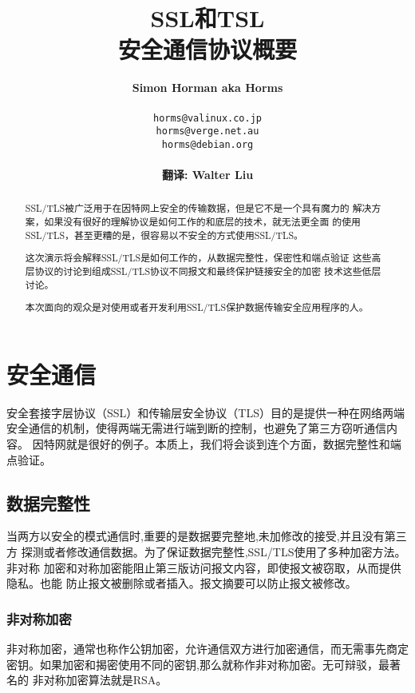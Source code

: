 \documentclass[11pt]{article}
\title{SSL和TSL\\
安全通信协议概要}
\author{\textbf{Simon Horman aka Horms} \\
        \\
\texttt{horms@valinux.co.jp}\\
\texttt{horms@verge.net.au}\\
\texttt{horms@debian.org}\\
\\
\textbf{翻译: Walter Liu}\\
}
\date{}
\begin{document}
\maketitle
\pagebreak

\begin{abstract}

          SSL/TLS被广泛用于在因特网上安全的传输数据，但是它不是一个具有魔力的
        解决方案，如果没有很好的理解协议是如何工作的和底层的技术，就无法更全面
        的使用SSL/TLS，甚至更糟的是，很容易以不安全的方式使用SSL/TLS。

        这次演示将会解释SSL/TLS是如何工作的，从数据完整性，保密性和端点验证
        这些高层协议的讨论到组成SSL/TLS协议不同报文和最终保护链接安全的加密
        技术这些低层讨论。

        本次面向的观众是对使用或者开发利用SSL/TLS保护数据传输安全应用程序的人。


\end{abstract}

\tableofcontents

\section{安全通信}

安全套接字层协议（SSL）和传输层安全协议（TLS）目的是提供一种在网络两端
安全通信的机制，使得两端无需进行端到断的控制，也避免了第三方窃听通信内容。
因特网就是很好的例子。本质上，我们将会谈到连个方面，数据完整性和端点验证。
\\

\subsection{数据完整性}
当两方以安全的模式通信时,重要的是数据要完整地,未加修改的接受,并且没有第三方
探测或者修改通信数据。为了保证数据完整性,SSL/TLS使用了多种加密方法。非对称
加密和对称加密能阻止第三版访问报文内容，即使报文被窃取，从而提供隐私。也能
防止报文被删除或者插入。报文摘要可以防止报文被修改。\\

\subsubsection{非对称加密}
非对称加密，通常也称作公钥加密，允许通信双方进行加密通信，而无需事先商定
密钥。如果加密和揭密使用不同的密钥,那么就称作非对称加密。无可辩驳，最著名的
非对称加密算法就是RSA。\\
\end{document}
